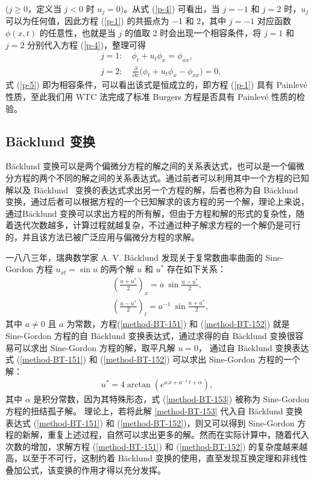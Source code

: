 ($j\geq 0$，定义当 $j<0$ 时 $u_j=0$)。从式 (\ref{p-4}) 可看出，当 $j = −1$ 和 $j = 2$ 时，$u_j$ 可以为任何值，因此方程 (\ref{p-1}) 的共振点为 −1 和 2，其中 $j = −1$ 对应函数 $\phi(x,t)$ 的任意性，也就是当 $j$ 的值取 2 时会出现一个相容条件，将 $j = 1$ 和 $j = 2$ 分别代入方程 (\ref{p-4})，整理可得
\begin{align}
& j=1: \quad \phi_t +u_t \phi_x=\phi_{xx},\label{p-5}\\
& j=2: \quad \frac{\partial}{\partial x}\big( \phi_t+u_t \phi_x - \phi_{xx} \big)=0.\nonumber
\end{align}
式 (\ref{p-5}) 即为相容条件，可以看出该式是恒成立的，即方程 (\ref{p-1}) 具有 Painlev\'{e} 性质，至此我们用 WTC 法完成了标准 Burgers 方程是否具有 Painlev\'{e} 性质的检验。
\subsection{B\"{a}cklund 变换}
B\"{a}cklund 变换可以是两个偏微分方程的解之间的关系表达式，也可以是一个偏微分方程的两个不同的解之间的关系表达式。通过前者可以利用其中一个方程的已知解以及 B\"{a}cklund~ 变换的表达式求出另一个方程的解，后者也称为自 B\"{a}cklund 变换，通过后者可以根据方程的一个已知解求的该方程的另一个解，理论上来说，通过B\"{a}cklund 变换可以求出方程的所有解，但由于方程和解的形式的复杂性，随着迭代次数越多，计算过程就越复杂，不过通过种子解求方程的一个解仍是可行的，并且该方法已被广泛应用与偏微分方程的求解。

一八八三年，瑞典数学家 A. V. B\"{a}cklund 发现关于复常数曲率曲面的  Sine-Gordon 方程 $u_{xt}=\sin u $ 的两个解 $u$ 和 $u^*$
存在如下关系：
\begin{eqnarray}
& (\frac{u+u^*}{2})_{x}= a\ \sin \frac{u-u^*}{2}  , \label{method-BT-151}
\\
& (\frac{u-u^*}{2})_{t}= a^{-1}\ \sin \frac{u+u^*}{2} , \label{method-BT-152}
\end{eqnarray}
其中 $a\neq 0$ 且 $a$ 为常数，方程(\ref{method-BT-151}) 和 (\ref{method-BT-152}) 就是
Sine-Gordon 方程的自 B\"{a}cklund 变换表达式，通过求得的自 B\"{a}cklund 变换很容易可以求出 Sine-Gordon 方程的解，取平凡解 $u=0$，
通过自 B\"{a}cklund 变换表达式 (\ref{method-BT-151}) 和 (\ref{method-BT-152}) 可以求出 Sine-Gordon 方程的一个解：
\begin{eqnarray}
u^*=4\arctan (e^{a\,x+a^{-1}\,t+\alpha} ) ,
\label{method-BT-153}
\end{eqnarray}
其中 $\alpha$ 是积分常数，因为其特殊形态，式 (\ref{method-BT-153}) 被称为 Sine-Gordon 方程的扭结孤子解。 理论上，若将此解 \eqref{method-BT-153} 代入自 B\"{a}cklund 变换表达式 (\ref{method-BT-151}) 和 (\ref{method-BT-152})，则又可以得到 Sine-Gordon 方程的新解，重复上述过程，自然可以求出更多的解。然而在实际计算中，随着代入次数的增加，求解方程 (\ref{method-BT-151}) 和 (\ref{method-BT-152}) 的复杂度越来越高，以至于不可行，这制约着 B\"{a}cklund 变换的使用，直至发现互换定理和非线性叠加公式，该变换的作用才得以充分发挥。

